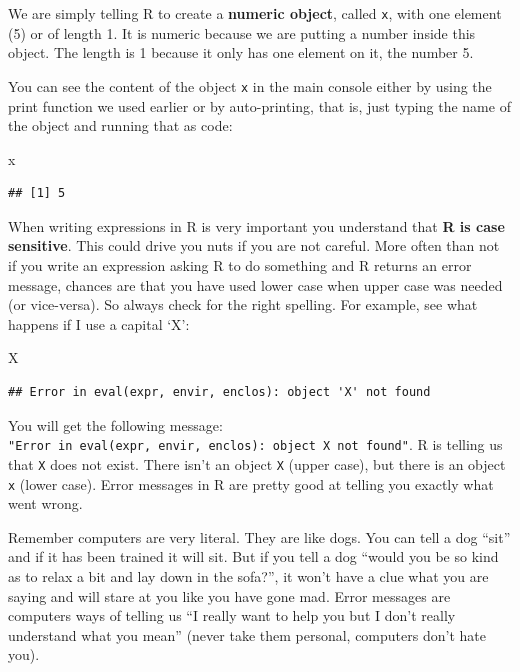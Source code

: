 \documentclass[]{book}
\newenvironment{Shaded}{\begin{snugshade}}{\end{snugshade}}
\newcommand{\NormalTok}[1]{#1}
\theoremstyle{definition}
\theoremstyle{definition}
\theoremstyle{definition}
\theoremstyle{remark}
\begin{document}
We are simply telling R to create a \textbf{numeric object}, called
\texttt{x}, with one element (5) or of length 1. It is numeric because
we are putting a number inside this object. The length is 1 because it
only has one element on it, the number 5.

You can see the content of the object \texttt{x} in the main console
either by using the print function we used earlier or by auto-printing,
that is, just typing the name of the object and running that as code:

\begin{Shaded}
\begin{Highlighting}[]
\NormalTok{x}
\end{Highlighting}
\end{Shaded}

\begin{verbatim}
## [1] 5
\end{verbatim}

When writing expressions in R is very important you understand that
\textbf{R is case sensitive}. This could drive you nuts if you are not
careful. More often than not if you write an expression asking R to do
something and R returns an error message, chances are that you have used
lower case when upper case was needed (or vice-versa). So always check
for the right spelling. For example, see what happens if I use a capital
`X':

\begin{Shaded}
\begin{Highlighting}[]
\NormalTok{X}
\end{Highlighting}
\end{Shaded}

\begin{verbatim}
## Error in eval(expr, envir, enclos): object 'X' not found
\end{verbatim}

You will get the following message:
\texttt{"Error\ in\ eval(expr,\ envir,\ enclos):\ object\ \textquotesingle{}X\textquotesingle{}\ not\ found"}.
R is telling us that \texttt{X} does not exist. There isn't an object
\texttt{X} (upper case), but there is an object \texttt{x} (lower case).
Error messages in R are pretty good at telling you exactly what went
wrong.

Remember computers are very literal. They are like dogs. You can tell a
dog ``sit'' and if it has been trained it will sit. But if you tell a
dog ``would you be so kind as to relax a bit and lay down in the
sofa?'', it won't have a clue what you are saying and will stare at you
like you have gone mad. Error messages are computers ways of telling us
``I really want to help you but I don't really understand what you
mean'' (never take them personal, computers don't hate you).
\end{document}
